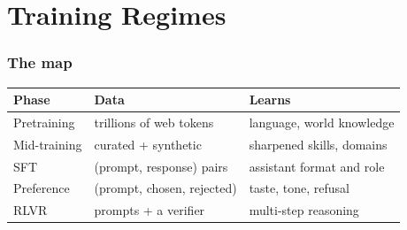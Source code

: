



\section{Training Regimes}

\begin{frame}
\frametitle{The map}
\vspace{0.2cm}
\begin{center}
\begin{tabular}{l|l|l}
\textbf{Phase} & \textbf{Data} & \textbf{Learns} \\
\hline
Pretraining  & trillions of web tokens    & language, world knowledge \\
Mid-training & curated + synthetic        & sharpened skills, domains \\
SFT          & (prompt, response) pairs   & assistant format and role \\
Preference   & (prompt, chosen, rejected) & taste, tone, refusal \\
RLVR         & prompts + a verifier       & multi-step reasoning \\
\end{tabular}
\end{center}
\end{frame}

